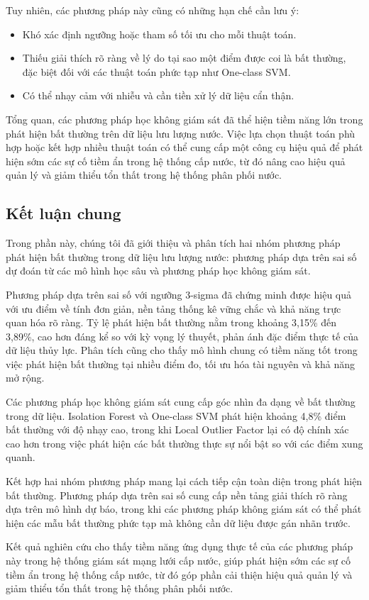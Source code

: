 Tuy nhiên, các phương pháp này cũng có những hạn chế cần lưu ý:

\begin{itemize}
    \item Khó xác định ngưỡng hoặc tham số tối ưu cho mỗi thuật toán.
    \item Thiếu giải thích rõ ràng về lý do tại sao một điểm được coi là bất thường, đặc biệt đối với các thuật toán phức tạp như One-class SVM.
    \item Có thể nhạy cảm với nhiễu và cần tiền xử lý dữ liệu cẩn thận.
\end{itemize}

Tổng quan, các phương pháp học không giám sát đã thể hiện tiềm năng lớn trong phát hiện bất thường trên dữ liệu lưu lượng nước. Việc lựa chọn thuật toán phù hợp hoặc kết hợp nhiều thuật toán có thể cung cấp một công cụ hiệu quả để phát hiện sớm các sự cố tiềm ẩn trong hệ thống cấp nước, từ đó nâng cao hiệu quả quản lý và giảm thiểu tổn thất trong hệ thống phân phối nước.

\subsection{Kết luận chung}

Trong phần này, chúng tôi đã giới thiệu và phân tích hai nhóm phương pháp phát hiện bất thường trong dữ liệu lưu lượng nước: phương pháp dựa trên sai số dự đoán từ các mô hình học sâu và phương pháp học không giám sát.

Phương pháp dựa trên sai số với ngưỡng 3-sigma đã chứng minh được hiệu quả với ưu điểm về tính đơn giản, nền tảng thống kê vững chắc và khả năng trực quan hóa rõ ràng. Tỷ lệ phát hiện bất thường nằm trong khoảng 3,15\% đến 3,89\%, cao hơn đáng kể so với kỳ vọng lý thuyết, phản ánh đặc điểm thực tế của dữ liệu thủy lực. Phân tích cũng cho thấy mô hình chung có tiềm năng tốt trong việc phát hiện bất thường tại nhiều điểm đo, tối ưu hóa tài nguyên và khả năng mở rộng.

Các phương pháp học không giám sát cung cấp góc nhìn đa dạng về bất thường trong dữ liệu. Isolation Forest và One-class SVM phát hiện khoảng 4,8\% điểm bất thường với độ nhạy cao, trong khi Local Outlier Factor lại có độ chính xác cao hơn trong việc phát hiện các bất thường thực sự nổi bật so với các điểm xung quanh.

Kết hợp hai nhóm phương pháp mang lại cách tiếp cận toàn diện trong phát hiện bất thường. Phương pháp dựa trên sai số cung cấp nền tảng giải thích rõ ràng dựa trên mô hình dự báo, trong khi các phương pháp không giám sát có thể phát hiện các mẫu bất thường phức tạp mà không cần dữ liệu được gán nhãn trước.

Kết quả nghiên cứu cho thấy tiềm năng ứng dụng thực tế của các phương pháp này trong hệ thống giám sát mạng lưới cấp nước, giúp phát hiện sớm các sự cố tiềm ẩn trong hệ thống cấp nước, từ đó góp phần cải thiện hiệu quả quản lý và giảm thiểu tổn thất trong hệ thống phân phối nước.

